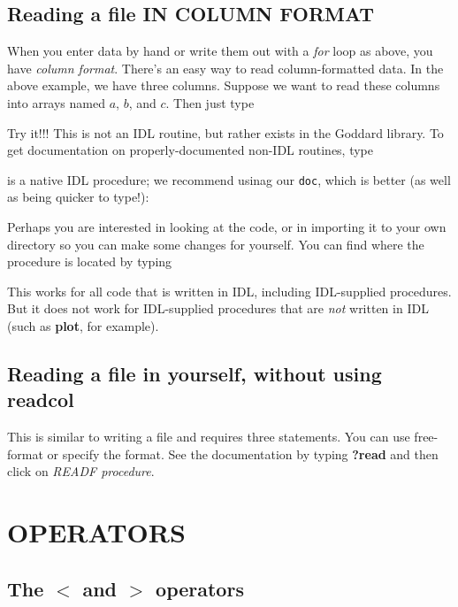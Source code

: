 \documentclass[psfig,preprint]{aastex}
\begin{document}
\subsection{Reading a file IN COLUMN FORMAT}

	When you enter data by hand or write them out with a {\it for}
loop as above, you have {\it column format}. There's an easy way to read
column-formatted data. In the above example, we have three columns.
Suppose we want to read these columns into arrays named $a$, $b$, and
$c$. Then just type


\noindent Try it!!! This is not an IDL routine, but rather exists in the
Goddard library.  To get documentation on properly-documented non-IDL
routines, type


 is a native IDL procedure; we recommend
usinag our {\tt doc}, which is better (as well as being quicker to type!): 



\noindent Perhaps you are interested in looking at the code, or in
importing it to your own directory so you can make some changes for
yourself. You can find where the procedure is located by typing


\noindent This works for all code that is written in IDL, including
IDL-supplied procedures. But it does not work for IDL-supplied
procedures that are {\it not} written in IDL (such as {\bf plot}, for
example).

\subsection{Reading a file in yourself, without using readcol}

	This is similar to writing a file and requires three statements.
You can use free-format or specify the format. See the documentation by
typing {\bf ?read} and then click on {\it READF procedure}.

\section{OPERATORS}

\subsection{ The $<$ and $>$ operators}
\end{document}

